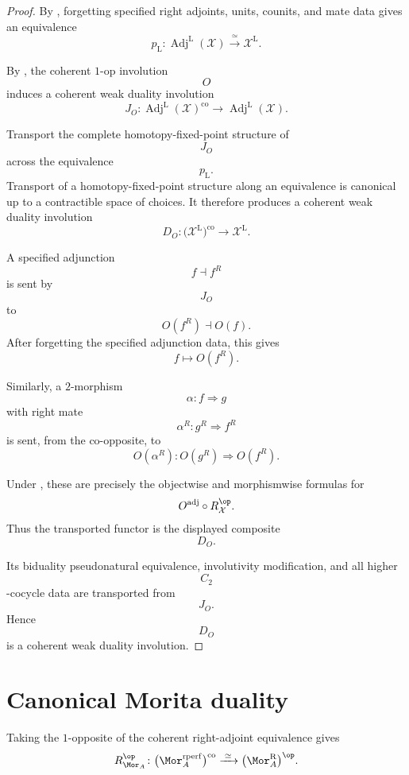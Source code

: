 \begin{proof}
By
,
forgetting specified right adjoints, units, counits, and mate data gives
an equivalence
\[
    p_{\mathrm L}
    \colon
    \operatorname{Adj}^{\mathrm L}(\mathcal X)
    \xrightarrow{\;\simeq\;}
    \mathcal X^{\mathrm L}.
\]

By
,
the coherent $1$-op involution
\[
    O
\]
induces a coherent weak duality involution
\[
    J_O
    \colon
    \operatorname{Adj}^{\mathrm L}(\mathcal X)^{\mathrm{co}}
    \longrightarrow
    \operatorname{Adj}^{\mathrm L}(\mathcal X).
\]

Transport the complete homotopy-fixed-point structure of
\[
    J_O
\]
across the equivalence
\[
    p_{\mathrm L}.
\]
Transport of a homotopy-fixed-point structure along an equivalence is
canonical up to a contractible space of choices. It therefore produces
a coherent weak duality involution
\[
    D_O
    \colon
    \bigl(
        \mathcal X^{\mathrm L}
    \bigr)^{\mathrm{co}}
    \longrightarrow
    \mathcal X^{\mathrm L}.
\]

A specified adjunction
\[
    f\dashv f^R
\]
is sent by
\[
    J_O
\]
to
\[
    O(f^R)\dashv O(f).
\]
After forgetting the specified adjunction data, this gives
\[
    f
    \longmapsto
    O(f^R).
\]

Similarly, a $2$-morphism
\[
    \alpha
    \colon
    f
    \Longrightarrow
    g
\]
with right mate
\[
    \alpha^R
    \colon
    g^R
    \Longrightarrow
    f^R
\]
is sent, from the co-opposite, to
\[
    O(\alpha^R)
    \colon
    O(g^R)
    \Longrightarrow
    O(f^R).
\]

Under
,
these are precisely the objectwise and morphismwise formulas for
\[
    O^{\mathrm{adj}}
    \circ
    R_{\mathcal X}^{\op}.
\]
Thus the transported functor is the displayed composite
\[
    D_O.
\]

Its biduality pseudonatural equivalence, involutivity modification, and
all higher
\[
    C_2
\]
-cocycle data are transported from
\[
    J_O.
\]
Hence
\[
    D_O
\]
is a coherent weak duality involution.
\end{proof}

\section{Canonical Morita duality}
\label{sec:canonical-morita-duality}

Taking the $1$-opposite of the coherent right-adjoint equivalence gives
\[
    R_{\Mor_A}^{\op}
    \colon
    \bigl(
        \Mor_A^{\mathrm{rperf}}
    \bigr)^{\mathrm{co}}
    \xrightarrow{\;\simeq\;}
    \bigl(
        \Mor_A^{\mathrm R}
    \bigr)^{\op}.
\]

